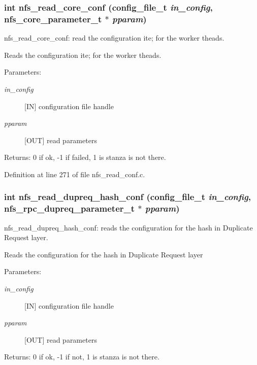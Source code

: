 \subsubsection{\setlength{\rightskip}{0pt plus 5cm}int nfs\_\-read\_\-core\_\-conf (config\_\-file\_\-t {\em in\_\-config}, nfs\_\-core\_\-parameter\_\-t $\ast$ {\em pparam})}\label{nfs__read__conf_8c_a1}


nfs\_\-read\_\-core\_\-conf: read the configuration ite; for the worker theads.

Reads the configuration ite; for the worker theads.

\begin{Desc}
\item[Parameters:]
\begin{description}
\item[{\em in\_\-config}][IN] configuration file handle \item[{\em pparam}][OUT] read parameters\end{description}
\end{Desc}
\begin{Desc}
\item[Returns:]0 if ok, -1 if failed, 1 is stanza is not there. \end{Desc}


Definition at line 271 of file nfs\_\-read\_\-conf.c.
\subsubsection{\setlength{\rightskip}{0pt plus 5cm}int nfs\_\-read\_\-dupreq\_\-hash\_\-conf (config\_\-file\_\-t {\em in\_\-config}, nfs\_\-rpc\_\-dupreq\_\-parameter\_\-t $\ast$ {\em pparam})}\label{nfs__read__conf_8c_a2}


nfs\_\-read\_\-dupreq\_\-hash\_\-conf: reads the configuration for the hash in Duplicate Request layer.

Reads the configuration for the hash in Duplicate Request layer

\begin{Desc}
\item[Parameters:]
\begin{description}
\item[{\em in\_\-config}][IN] configuration file handle \item[{\em pparam}][OUT] read parameters\end{description}
\end{Desc}
\begin{Desc}
\item[Returns:]0 if ok, -1 if not, 1 is stanza is not there. \end{Desc}


